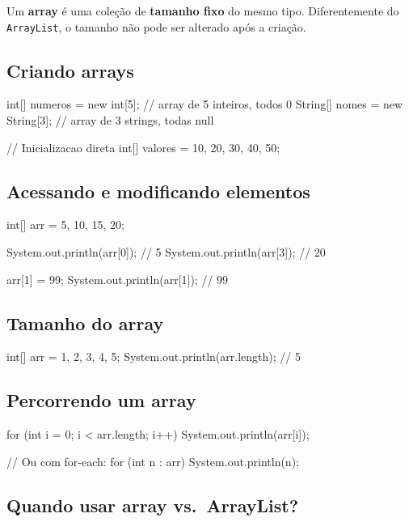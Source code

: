\documentclass[12pt, a4paper]{article}
\newcommand{\code}[1]{\texttt{\color{javaDeep}#1}}
\begin{document}
Um \textbf{array} é uma coleção de \textbf{tamanho fixo} do mesmo tipo. Diferentemente do \code{ArrayList}, o tamanho não pode ser alterado após a criação.

\subsection{Criando arrays}

\begin{javacode}
int[] numeros = new int[5];         // array de 5 inteiros, todos 0
String[] nomes = new String[3];     // array de 3 strings, todas null

// Inicializacao direta
int[] valores = {10, 20, 30, 40, 50};
\end{javacode}

\subsection{Acessando e modificando elementos}

\begin{javacode}
int[] arr = {5, 10, 15, 20};

System.out.println(arr[0]); // 5
System.out.println(arr[3]); // 20

arr[1] = 99;
System.out.println(arr[1]); // 99
\end{javacode}

\subsection{Tamanho do array}

\begin{javacode}
int[] arr = {1, 2, 3, 4, 5};
System.out.println(arr.length); // 5
\end{javacode}

\subsection{Percorrendo um array}

\begin{javacode}
for (int i = 0; i < arr.length; i++) {
    System.out.println(arr[i]);
}

// Ou com for-each:
for (int n : arr) {
    System.out.println(n);
}
\end{javacode}

\subsection{Quando usar array vs.\ ArrayList?}
\end{document}
